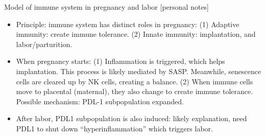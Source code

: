 \documentclass{report}
\begin{document}
Model of immune system in pregnancy and labor [personal notes]
\begin{itemize}
	
	\item Principle: immune system has distinct roles in pregnancy: (1) Adaptive immunity: create immune tolerance. (2) Innate immunity: implantation, and labor/parturition. 
	
	\item When pregnancy starts: (1) Inflammation is triggered, which helps implantation. This process is likely mediated by SASP. Meanwhile, senescence cells are cleared up by NK cells, creating a balance. (2) When immune cells move to placental (maternal), they also change to create immune tolerance. Possible mechanism: PDL-1 subpopulation expanded. 
	
	\item After labor, PDL1 subpopulation is also induced: likely explanation, need PDL1 to shut down “hyperinflammation” which triggers labor. 
\end{itemize}
\end{document}
